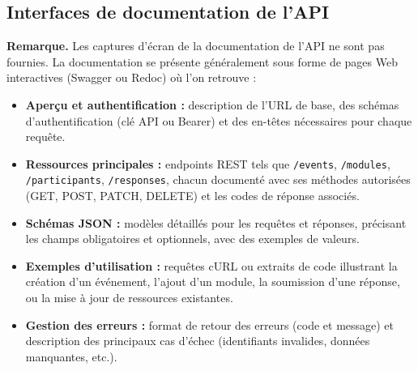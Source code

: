 \subsection{Interfaces de documentation de l'API}
\textbf{Remarque.} Les captures d'écran de la documentation de l'API ne sont pas
fournies. La documentation se présente généralement sous forme de pages Web
interactives (Swagger ou Redoc) où l'on retrouve :
\begin{itemize}
  \item \textbf{Aperçu et authentification :} description de l'URL de base,
    des schémas d'authentification (clé API ou Bearer) et des en-têtes
    nécessaires pour chaque requête.
  \item \textbf{Ressources principales :} endpoints REST tels que
    \texttt{/events}, \texttt{/modules}, \texttt{/participants}, \texttt{/responses},
    chacun documenté avec ses méthodes autorisées (GET, POST, PATCH, DELETE)
    et les codes de réponse associés.
  \item \textbf{Schémas JSON :} modèles détaillés pour les requêtes et
    réponses, précisant les champs obligatoires et optionnels, avec des
    exemples de valeurs.
  \item \textbf{Exemples d'utilisation :} requêtes cURL ou extraits de
    code illustrant la création d'un événement, l'ajout d'un module, la
    soumission d'une réponse, ou la mise à jour de ressources existantes.
  \item \textbf{Gestion des erreurs :} format de retour des erreurs (code
    et message) et description des principaux cas d'échec (identifiants
    invalides, données manquantes, etc.).
\end{itemize}

